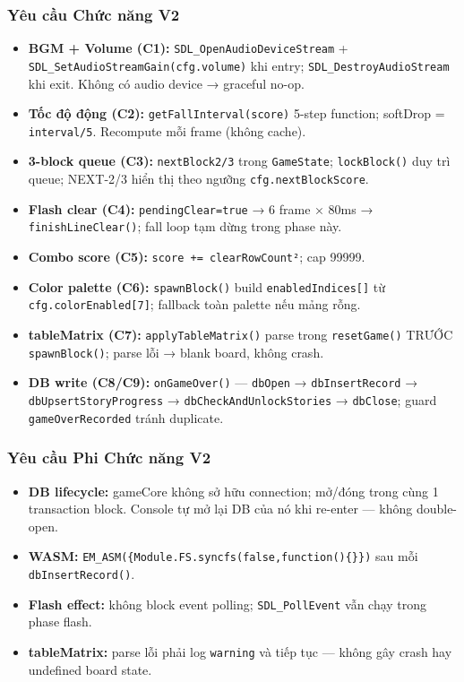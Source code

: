 \documentclass[12pt,a4paper]{article}
\begin{document}
\subsubsection{Yêu cầu Chức năng V2}
\begin{itemize}[leftmargin=*]
    \item \textbf{BGM + Volume (C1):} \texttt{SDL\_OpenAudioDeviceStream} + \texttt{SDL\_SetAudioStreamGain(cfg.volume)} khi entry; \texttt{SDL\_DestroyAudioStream} khi exit. Không có audio device → graceful no-op.
    \item \textbf{Tốc độ động (C2):} \texttt{getFallInterval(score)} 5-step function; softDrop = \texttt{interval/5}. Recompute mỗi frame (không cache).
    \item \textbf{3-block queue (C3):} \texttt{nextBlock2/3} trong \texttt{GameState}; \texttt{lockBlock()} duy trì queue; NEXT-2/3 hiển thị theo ngưỡng \texttt{cfg.nextBlockScore}.
    \item \textbf{Flash clear (C4):} \texttt{pendingClear=true} → 6 frame × 80ms → \texttt{finishLineClear()}; fall loop tạm dừng trong phase này.
    \item \textbf{Combo score (C5):} \texttt{score += clearRowCount²}; cap 99999.
    \item \textbf{Color palette (C6):} \texttt{spawnBlock()} build \texttt{enabledIndices[]} từ \texttt{cfg.colorEnabled[7]}; fallback toàn palette nếu mảng rỗng.
    \item \textbf{tableMatrix (C7):} \texttt{applyTableMatrix()} parse trong \texttt{resetGame()} TRƯỚC \texttt{spawnBlock()}; parse lỗi → blank board, không crash.
    \item \textbf{DB write (C8/C9):} \texttt{onGameOver()} — \texttt{dbOpen} → \texttt{dbInsertRecord} → \texttt{dbUpsertStoryProgress} → \texttt{dbCheckAndUnlockStories} → \texttt{dbClose}; guard \texttt{gameOverRecorded} tránh duplicate.
\end{itemize}

\subsubsection{Yêu cầu Phi Chức năng V2}
\begin{itemize}[noitemsep, leftmargin=*]
    \item \textbf{DB lifecycle:} gameCore không sở hữu connection; mở/đóng trong cùng 1 transaction block. Console tự mở lại DB của nó khi re-enter — không double-open.
    \item \textbf{WASM:} \texttt{EM\_ASM(\{Module.FS.syncfs(false,function()\{\}\})} sau mỗi \texttt{dbInsertRecord()}.
    \item \textbf{Flash effect:} không block event polling; \texttt{SDL\_PollEvent} vẫn chạy trong phase flash.
    \item \textbf{tableMatrix:} parse lỗi phải log \texttt{warning} và tiếp tục — không gây crash hay undefined board state.
\end{itemize}
\end{document}

